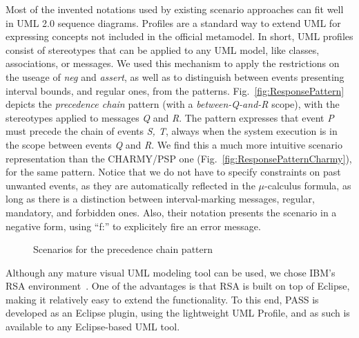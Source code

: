 \documentclass[letter]{llncs}
\begin{document}
Most of the invented notations used by existing scenario approaches can fit well in UML 2.0 sequence diagrams.
Profiles are a standard way to extend UML for expressing concepts not included in the official metamodel. 
In short, UML profiles consist of stereotypes that can be applied to any UML model, like classes,
associations, or messages. We used this mechanism 
to apply the restrictions on the useage of \emph{neg} and \emph{assert},
as well as to distinguish between events presenting interval bounds, and regular ones, from the patterns.
Fig.~\ref{fig:ResponsePattern} depicts the \emph{precedence chain} pattern (with a \emph{between-Q-and-R} scope), with the stereotypes applied to messages \emph{Q} and \emph{R}.
The pattern expresses that event \emph{P} must precede the chain of events \emph{S, T}, always when the system execution is in the scope between events \emph{Q} and \emph{R}.
We find this a much more intuitive scenario representation than the CHARMY/PSP one (Fig.~\ref{fig:ResponsePatternCharmy}), for the same pattern.
Notice that we do not have to specify constraints on past unwanted events, as they are automatically
reflected in the $\mu$-calculus formula, as long as there is a distinction between interval-marking messages,
regular, mandatory, and forbidden ones. Also, their notation presents the scenario in a negative form, using ``f:'' to
explicitely fire an error message. 
\begin{figure}[t!]
  \centering
  \hfill
  \caption{Scenarios for the precedence chain pattern}
\end{figure}
Although any mature visual UML modeling tool 
can be used, we chose IBM's RSA environment~\cite{terry2006visual}.
One of the advantages is that RSA is built on top of Eclipse, making 
it relatively easy to extend the functionality. To this end, PASS is developed as an Eclipse plugin, using the 
lightweight UML Profile, and as such is available to any Eclipse-based UML tool.
\end{document}

